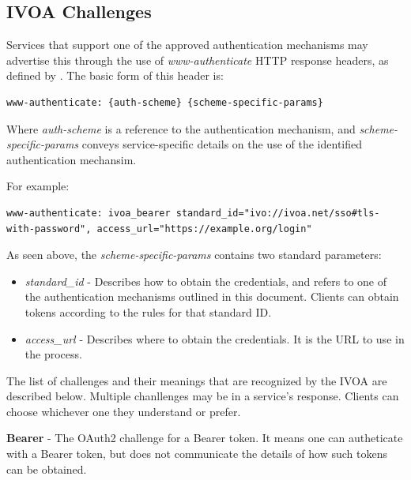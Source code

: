 \documentclass[11pt,a4paper]{ivoa}
\begin{document}
\subsection{IVOA Challenges}

Services that support one of the approved authentication mechanisms may
advertise this through the use of \emph{www-authenticate} HTTP response
headers, as defined by \citep{std:RFC7235}. The basic form of this
header is:

\begin{verbatim}
www-authenticate: {auth-scheme} {scheme-specific-params}
\end{verbatim}

Where \emph{auth-scheme} is a reference to the authentication mechanism,
and \emph{scheme-specific-params} conveys service-specific details on
the use of the identified authentication mechansim.

For example:

\begin{verbatim}
www-authenticate: ivoa_bearer standard_id="ivo://ivoa.net/sso#tls-with-password", access_url="https://example.org/login"
\end{verbatim}

As seen above, the \emph{scheme-specific-params} contains two standard
parameters:

\begin{itemize}
\item{\emph{standard\_id}} - Describes how to obtain the credentials,
and refers to one of the authentication mechanisms outlined in this
document. Clients can obtain tokens according to the rules for that
standard ID.
\item{\emph{access\_url}} - Describes where to obtain the credentials.
It is the URL to use in the process.
\end{itemize}

The list of challenges and their meanings that are recognized by the
IVOA are described below. Multiple chanllenges may be in a service's
response. Clients can choose whichever one they understand or prefer.

\textbf{Bearer} - The OAuth2 \citep{std:RFC6749} challenge for a Bearer
token. It means one can autheticate with a Bearer token, but does not
communicate the details of how such tokens can be obtained.
\end{document}
